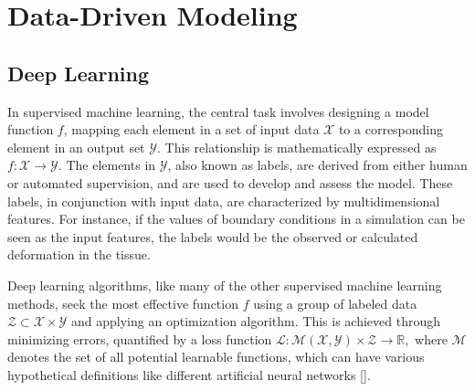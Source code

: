 \documentclass[12pt,a4paper]{report}
\begin{document}
\section{Data-Driven Modeling}
\subsection{Deep Learning}

In supervised machine learning, the central task involves designing a model function $f$, mapping each element in a set of input data $\mathcal{X}$ to a corresponding element in an output set $\mathcal{Y}$. This relationship is mathematically expressed as $f: \mathcal{X} \longrightarrow \mathcal{Y}.$ The elements in $\mathcal{Y}$, also known as labels, are derived from either human or automated supervision, and are used to develop and assess the model. These labels, in conjunction with input data, are characterized by multidimensional features. For instance, if the values of boundary conditions in a simulation can be seen as the input features, the labels would be the observed or calculated deformation in the tissue.

Deep learning algorithms, like many of the other supervised machine learning methods, seek the most effective function $f$ using a group of labeled data $\mathcal{Z}\subset \mathcal{X} \times \mathcal{Y}$ and applying an optimization algorithm. This is achieved through minimizing errors, quantified by a loss function $\mathcal{L}: \mathcal{M} \left ( \mathcal{X},\mathcal{Y} \right ) \times \mathcal{Z} \longrightarrow \mathbb{R},$ where $\mathcal{M}$ denotes the set of all potential learnable functions, which can have various hypothetical definitions like different artificial neural networks [\cite{abiodun2019}].
\end{document}
